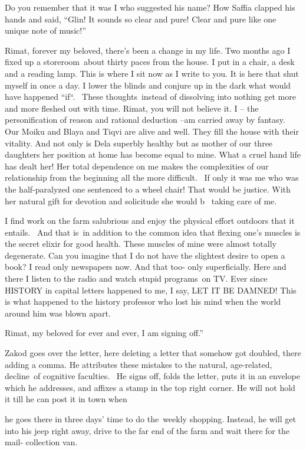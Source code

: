 \documentclass[twoside,11pt]{book}
\begin{document}
Do you remember that it was I who suggested his name? How Saffia clapped his hands and said, ``Glin! It
sounds so clear and pure! Clear and pure like one unique {note of music}!''

Rimat, forever my beloved, there's been a change in my life. Two months ago I fixed up a storeroom~about thirty paces
from the house. I put in a chair, a desk and a reading lamp. This is where I sit now as I write to you. It is here that
shut myself in once a day. I lower the blinds and conjure up in the dark what would have happened
``if``.~ These thoughts~instead of dissolving into nothing get more and more fleshed out with
time. Rimat, you will not believe it. I -- the personification of reason and rational deduction --am carried away by
fantasy.~ Our Moiku and Blaya and Tiqvi are alive and well. They fill the house with their vitality. And not only is
Dela superbly healthy but as mother of our three daughters her position at home has become equal to mine. What a cruel
hand life has dealt her! Her total dependence on me makes the complexities of our relationship from the beginning all
the more difficult. \ If only it was me who was the half-paralyzed one sentenced to a wheel chair! That would be
justice. With her natural gift for devotion and solicitude she would b \ taking care of me.~

I find work on the farm salubrious and enjoy the physical effort outdoors that it entails.~ And that is~in addition to
the common idea that flexing one's muscles is the secret elixir for good health. These muscles of mine were almost
totally degenerate. Can you imagine that I do not have the slightest desire to open a book? I read only newspapers now.
And that too- only superficially. Here and there I listen to the radio and watch stupid programs~on TV. Ever since
HISTORY in capital letters happened to me, I say, LET IT BE DAMNED! This is what happened to the history professor who
lost his mind when the world around him was blown apart.

Rimat, my beloved for ever and ever, I am signing off.''

Zakod goes over the letter, here deleting a letter that somehow got doubled, there adding a comma. He attributes these
mistakes to the natural, age-related, decline~of cognitive faculties. \ He signs off, folds the letter, puts it in an
envelope which he addresses, and affixes a stamp in the top right corner. He will not hold it till he can post it in
town when

he goes there in three days' time to do the~weekly shopping. Instead, he will get into his jeep right away, drive to the
far end of the farm and wait there for the mail- collection van.
\end{document}
